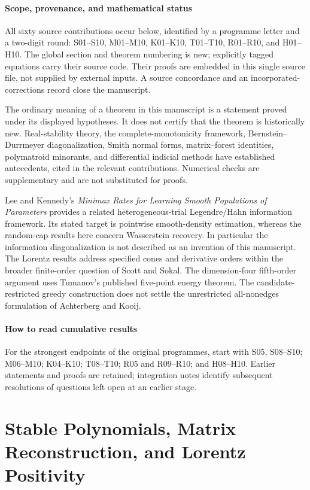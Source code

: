 \documentclass[11pt,a4paper]{article}
\theoremstyle{definition}\newtheorem{definition}[theorem]{Definition}
\theoremstyle{remark}\newtheorem{remark}[theorem]{Remark}
\numberwithin{equation}{section}
\begin{document}
\subsection*{Scope, provenance, and mathematical status}
All sixty source contributions occur below, identified by a programme letter and a two-digit round: S01--S10, M01--M10, K01--K10, T01--T10, R01--R10, and H01--H10. The global section and theorem numbering is new; explicitly tagged equations carry their source code. Their proofs are embedded in this single source file, not supplied by external inputs. A source concordance and an incorporated-corrections record close the manuscript.

The ordinary meaning of a theorem in this manuscript is a statement proved under its displayed hypotheses. It does not certify that the theorem is historically new. Real-stability theory, the complete-monotonicity framework, Bernstein--Durrmeyer diagonalization, Smith normal forms, matrix--forest identities, polymatroid minorants, and differential indicial methods have established antecedents, cited in the relevant contributions. Numerical checks are supplementary and are not substituted for proofs.

Lee and Kennedy's \emph{Minimax Rates for Learning Smooth Populations of Parameters} \cite{integration-lee-kennedy} provides a related heterogeneous-trial Legendre/Hahn information framework. Its stated target is pointwise smooth-density estimation, whereas the random-cap results here concern Wasserstein recovery. In particular the information diagonalization is not described as an invention of this manuscript. The Lorentz results address specified cones and derivative orders within the broader finite-order question of Scott and Sokal. The dimension-four fifth-order argument uses Tumanov's published five-point energy theorem. The candidate-restricted greedy construction does not settle the unrestricted all-nonedges formulation of Achterberg and Kooij.

\subsection*{How to read cumulative results}
For the strongest endpoints of the original programmes, start with S05, S08--S10; M06--M10; K04--K10; T08--T10; R05 and R09--R10; and H08--H10. Earlier statements and proofs are retained; integration notes identify subsequent resolutions of questions left open at an earlier stage.


\clearpage
\part{Stable Polynomials, Matrix Reconstruction, and Lorentz Positivity}
\end{document}
